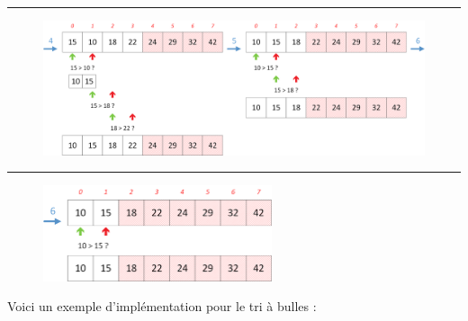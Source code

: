 \documentclass[11pt,a4paper]{article}
\begin{document}
\par\rule{\textwidth}{0.5pt} 

\medskip

\begin{figure}[ht!]
\centering
\centerline{
\includegraphics[width=1.2\textwidth]{img/tris/2_per_pages/BubbleSort_part3.png}
}
\end{figure}

\medskip

\par\rule{\textwidth}{0.5pt} 

\vfillLast

\begin{figure}[ht!]
\centering
\centerline{
\includegraphics[width=0.6\textwidth]{img/tris/2_per_pages/BubbleSort_part4.png}
}
\end{figure}


\bigskip


\clearpage

Voici un exemple d'implémentation pour le tri à bulles :

\bigskip
\end{document}
